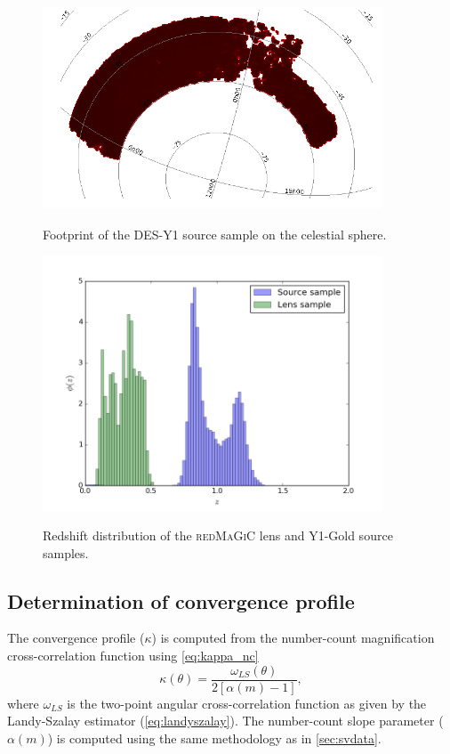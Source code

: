 \begin{figure}
\begin{center}
\includegraphics[width=0.9\textwidth]{./figures_y1/masky1.png}
\caption{Footprint of the DES-Y1 source sample on the celestial sphere.}
\label{fig:footprint_y1}
\includegraphics[width=0.9\textwidth]{./figures_y1/phiz_mag_auto_i1.png}
\caption{Redshift distribution of the {\scshape redMaGiC} lens and Y1-Gold source samples.}
\label{fig:ndz_y1}
\end{center}
\end{figure}

\subsection{Determination of convergence profile}
\label{sec:analysis_y1}
The convergence profile ($\kappa$) is computed from the number-count magnification cross-correlation function using \autoref{eq:kappa_nc}
\begin{equation}
\kappa(\theta) = \frac{\omega_{LS}(\theta)}{2[\alpha(m)-1]},
\end{equation}
where $\omega_{LS}$ is the two-point angular cross-correlation function as given by the Landy-Szalay estimator (\autoref{eq:landyszalay}). The number-count slope parameter ($\alpha(m)$) is computed using the same methodology as in \autoref{sec:svdata}.
